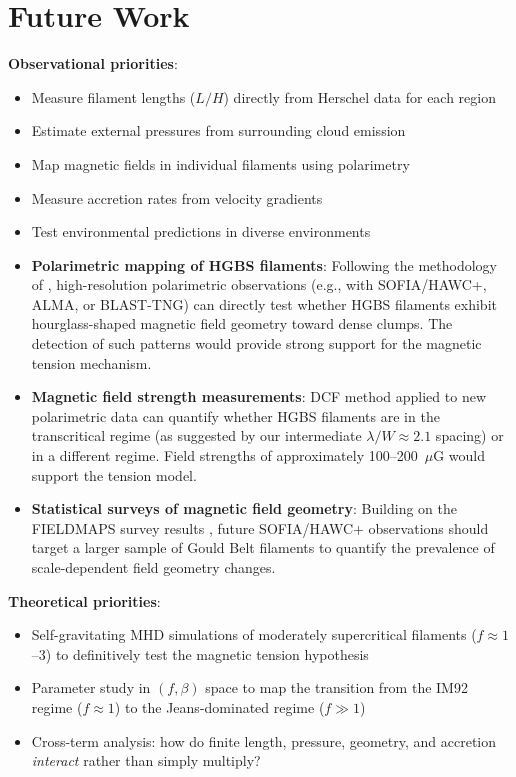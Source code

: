 \documentclass[11pt,a4paper]{article}
\begin{document}
\section{Future Work}
\label{sec:future}

\textbf{Observational priorities}:
\begin{itemize}
    \item Measure filament lengths ($L/H$) directly from Herschel data for each region
    \item Estimate external pressures from surrounding cloud emission
    \item Map magnetic fields in individual filaments using polarimetry
    \item Measure accretion rates from velocity gradients \citep{Chen2024}
    \item Test environmental predictions in diverse environments
    \item \textbf{Polarimetric mapping of HGBS filaments}: Following the methodology of \citet{Jadhav2026}, high-resolution polarimetric observations (e.g., with SOFIA/HAWC+, ALMA, or BLAST-TNG) can directly test whether HGBS filaments exhibit hourglass-shaped magnetic field geometry toward dense clumps. The detection of such patterns would provide strong support for the magnetic tension mechanism.
    \item \textbf{Magnetic field strength measurements}: DCF method applied to new polarimetric data can quantify whether HGBS filaments are in the transcritical regime (as suggested by our intermediate $\lambda/W \approx 2.1$ spacing) or in a different regime. Field strengths of approximately 100--200~$\mu$G would support the tension model.
    \item \textbf{Statistical surveys of magnetic field geometry}: Building on the FIELDMAPS survey results \citep{Coude2025}, future SOFIA/HAWC+ observations should target a larger sample of Gould Belt filaments to quantify the prevalence of scale-dependent field geometry changes.
\end{itemize}

\textbf{Theoretical priorities}:
\begin{itemize}
    \item Self-gravitating MHD simulations of moderately supercritical filaments ($f \approx 1$--$3$) to definitively test the magnetic tension hypothesis
    \item Parameter study in $(f, \beta)$ space to map the transition from the IM92 regime ($f \approx 1$) to the Jeans-dominated regime ($f \gg 1$)
    \item Cross-term analysis: how do finite length, pressure, geometry, and accretion \textit{interact} rather than simply multiply?
\end{itemize}
\end{document}
